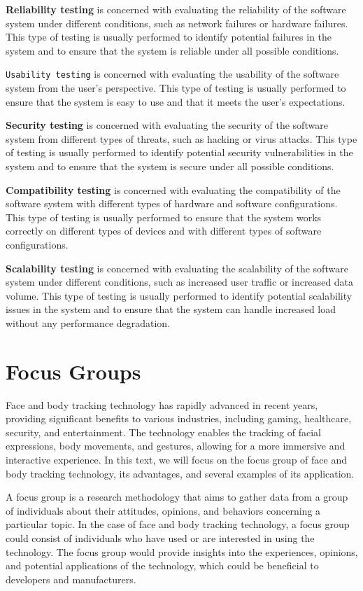 \textbf{Reliability testing} is concerned with evaluating the reliability of the software system under different conditions, 
such as network failures or hardware failures. This type of testing is usually performed to identify potential failures 
in the system and to ensure that the system is reliable under all possible conditions.

\texttt{Usability testing} is concerned with evaluating the usability of the software system from the user's perspective. This 
type of testing is usually performed to ensure that the system is easy to use and that it meets the user's expectations.

\textbf{Security testing} is concerned with evaluating the security of the software system from different types of threats, such as 
hacking or virus attacks. This type of testing is usually performed to identify potential security vulnerabilities in the 
system and to ensure that the system is secure under all possible conditions.

\textbf{Compatibility testing} is concerned with evaluating the compatibility of the software system with different types of hardware 
and software configurations. This type of testing is usually performed to ensure that the system works correctly on different 
types of devices and with different types of software configurations.

\textbf{Scalability testing} is concerned with evaluating the scalability of the software system under different conditions, such as 
increased user traffic or increased data volume. This type of testing is usually performed to identify potential scalability 
issues in the system and to ensure that the system can handle increased load without any performance degradation.

\section{Focus Groups}
Face and body tracking technology has rapidly advanced in recent years, providing significant benefits to various industries, 
including gaming, healthcare, security, and entertainment. The technology enables the tracking of facial expressions, body movements, 
and gestures, allowing for a more immersive and interactive experience. In this text, we will focus on the focus group of face and body 
tracking technology, its advantages, and several examples of its application.

A focus group is a research methodology that aims to gather data from a group of individuals about their attitudes, opinions, 
and behaviors concerning a particular topic. In the case of face and body tracking technology, a focus group could consist of 
individuals who have used or are interested in using the technology. The focus group would provide insights into the experiences, 
opinions, and potential applications of the technology, which could be beneficial to developers and manufacturers.

